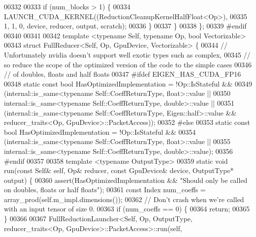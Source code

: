 \begin{DoxyCode}
00332 
00333     \textcolor{keywordflow}{if} (num\_blocks > 1) \{
00334       LAUNCH\_CUDA\_KERNEL((ReductionCleanupKernelHalfFloat<Op>),
00335                          1, 1, 0, device, reducer, output, scratch);
00336     \}
00337   \}
00338 \};
00339 \textcolor{preprocessor}{#endif}
00340 
00341 
00342 \textcolor{keyword}{template} <\textcolor{keyword}{typename} Self, \textcolor{keyword}{typename} Op, \textcolor{keywordtype}{bool} Vectorizable>
00343 \textcolor{keyword}{struct }FullReducer<Self, Op, GpuDevice, Vectorizable> \{
00344   \textcolor{comment}{// Unfortunately nvidia doesn't support well exotic types such as complex,}
00345   \textcolor{comment}{// so reduce the scope of the optimized version of the code to the simple cases}
00346   \textcolor{comment}{// of doubles, floats and half floats}
00347 \textcolor{preprocessor}{#ifdef EIGEN\_HAS\_CUDA\_FP16}
00348   \textcolor{keyword}{static} \textcolor{keyword}{const} \textcolor{keywordtype}{bool} HasOptimizedImplementation = !Op::IsStateful &&
00349       (internal::is\_same<typename Self::CoeffReturnType, float>::value ||
00350        internal::is\_same<typename Self::CoeffReturnType, double>::value ||
00351        (internal::is\_same<typename Self::CoeffReturnType, Eigen::half>::value && reducer\_traits<Op,
       GpuDevice>::PacketAccess));
00352 \textcolor{preprocessor}{#else}
00353   \textcolor{keyword}{static} \textcolor{keyword}{const} \textcolor{keywordtype}{bool} HasOptimizedImplementation = !Op::IsStateful &&
00354                                                 (internal::is\_same<typename Self::CoeffReturnType,
       float>::value ||
00355                                                  internal::is\_same<typename Self::CoeffReturnType,
       double>::value);
00356 \textcolor{preprocessor}{#endif}
00357 
00358   \textcolor{keyword}{template} <\textcolor{keyword}{typename} OutputType>
00359   \textcolor{keyword}{static} \textcolor{keywordtype}{void} run(\textcolor{keyword}{const} Self& \textcolor{keyword}{self}, Op& reducer, \textcolor{keyword}{const} GpuDevice& device, OutputType* output) \{
00360     assert(HasOptimizedImplementation && \textcolor{stringliteral}{"Should only be called on doubles, floats or half floats"});
00361     \textcolor{keyword}{const} Index num\_coeffs = array\_prod(\textcolor{keyword}{self}.m\_impl.dimensions());
00362     \textcolor{comment}{// Don't crash when we're called with an input tensor of size 0.}
00363     \textcolor{keywordflow}{if} (num\_coeffs == 0) \{
00364       \textcolor{keywordflow}{return};
00365     \}
00366 
00367     FullReductionLauncher<Self, Op, OutputType, reducer\_traits<Op, GpuDevice>::PacketAccess>::run(\textcolor{keyword}{self}, 

\end{DoxyCode}
